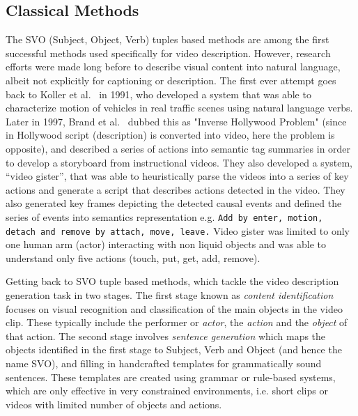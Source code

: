 \documentclass[10pt,journal,compsoc]{IEEEtran}
\begin{document}
\subsection{Classical Methods} %
\label{sec:svo}
The SVO (Subject, Object, Verb) tuples based methods are among the first successful methods used specifically for video description. 
However, research efforts were made long before to describe visual content into natural language, albeit not explicitly for captioning or description. The first ever attempt goes back to Koller et al.~\cite{koller1991algorithmic} in 1991, who developed a system that was able to characterize motion of vehicles in real traffic scenes using natural language verbs. Later in 1997, Brand et al.~\cite{brand1997inverse} dubbed this as "Inverse Hollywood Problem" (since in Hollywood script (description) is converted into video, here the problem is opposite), and described a series of actions into semantic tag summaries in order to develop a storyboard from instructional videos. They also developed a system, ``video gister'', that was able to heuristically parse the videos into a series of key actions and generate a script that describes actions detected in the video. They also generated key frames depicting the detected causal events and defined the series of events into semantics representation e.g. {\tt Add by enter, motion, detach and remove by attach, move, leave.} Video gister was limited to only one human arm (actor) interacting with non liquid objects and was able to understand only five actions (touch, put, get, add, remove).


Getting back to SVO tuple based methods, which tackle the video description generation task in two stages. The first stage known as \textit{content identification} focuses on visual recognition and classification of the main objects in the video clip. These typically include the performer or \textit{actor}, the \textit{action} and the \textit{object} of that action. The second stage involves \textit{sentence generation} which maps the objects identified in the first stage to Subject, Verb and Object (and hence the name SVO), and filling in handcrafted templates for grammatically sound sentences. These templates are created using grammar or rule-based systems, which are only effective in very constrained environments, i.e. short clips or videos with limited number of objects and actions. 
\end{document}
